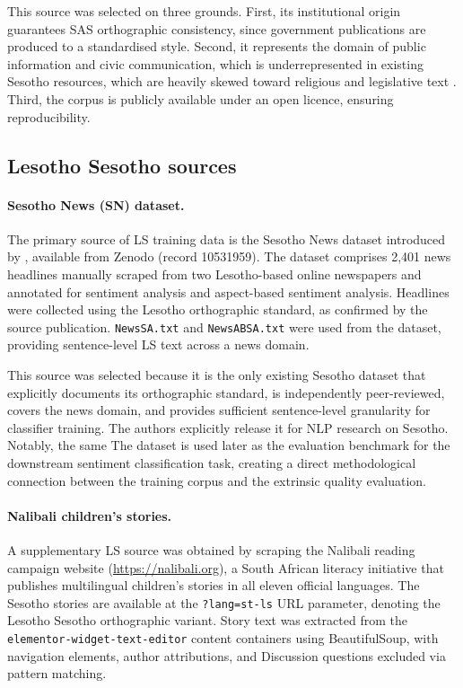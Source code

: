 \documentclass[11pt,a4paper]{article}
\begin{document}
This source was selected on three grounds. First, its institutional origin
guarantees SAS orthographic consistency, since government publications are
produced to a standardised style. Second, it represents the domain of public
information and civic communication, which is underrepresented in existing
Sesotho resources, which are heavily skewed toward religious and legislative
text \citep{kwon2026afroscope}. Third, the corpus is publicly available under an
open licence, ensuring reproducibility.

\subsection{Lesotho Sesotho sources}

\paragraph{Sesotho News (SN) dataset.}
The primary source of LS training data is the Sesotho News dataset introduced
by \citet{mokhosi2024sesotho}, available from Zenodo (record 10531959). The
dataset comprises 2,401 news headlines manually scraped from two Lesotho-based
online newspapers and annotated for sentiment analysis and aspect-based sentiment
analysis. Headlines were collected using the Lesotho orthographic standard, as
confirmed by the source publication. \texttt{NewsSA.txt} and \texttt{NewsABSA.txt} were used from the dataset, providing sentence-level LS text
across a news domain.

This source was selected because it is the only existing Sesotho dataset that
explicitly documents its orthographic standard, is independently peer-reviewed,
covers the news domain, and provides sufficient sentence-level granularity for
classifier training. The authors explicitly release it for NLP research on Sesotho. Notably, the same
The dataset is used later as the evaluation benchmark for the downstream sentiment
classification task, creating a direct methodological connection between the
training corpus and the extrinsic quality evaluation.

\paragraph{Nalibali children's stories.}
A supplementary LS source was obtained by scraping the Nalibali reading
campaign website (\url{https://nalibali.org}), a South African literacy
initiative that publishes multilingual children's stories in all eleven official
languages. The Sesotho stories are available at the \texttt{?lang=st-ls} URL
parameter, denoting the Lesotho Sesotho orthographic variant. Story text was
extracted from the \texttt{elementor-widget-text-editor} content containers
using BeautifulSoup, with navigation elements, author attributions, and
Discussion questions excluded via pattern matching.
\end{document}
